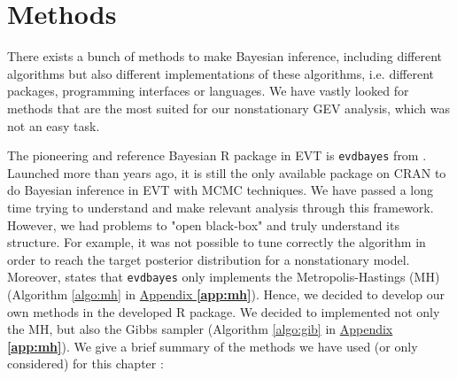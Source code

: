 \section{Methods }\label{sec:meth}


There exists a bunch of methods to make Bayesian inference, including different algorithms but also different implementations of these algorithms, i.e. different packages, programming interfaces or languages. We have vastly looked for methods that are the most suited for our nonstationary GEV analysis, which was not an easy task.

The pioneering and reference Bayesian R package in EVT is \texttt{evdbayes} from \citet{ribatet_users_2006}. Launched more than years ago, it is still the only available package on CRAN to do Bayesian inference in EVT with MCMC techniques. We have passed a long time trying to understand and make relevant analysis through this framework. However, we had problems to "open black-box" and truly understand its structure. For example, it was not possible to tune correctly the algorithm in order to reach the target posterior distribution for a nonstationary model. Moreover, \citet{hartmann_bayesian_2016} states that \texttt{evdbayes} only implements the Metropolis-Hastings (MH) (Algorithm \ref{algo:mh} in \hyperref[app:mh]{Appendix \textbf{\ref{app:mh}}}).
Hence, we decided to develop our own methods in the developed R package. We decided to implemented not only the MH,  but also the Gibbs sampler (Algorithm \ref{algo:gib} in \hyperref[app:mh]{Appendix \textbf{\ref{app:mh}}}).
 We give a brief summary of the methods we have used (or only considered) for this chapter : 
 
